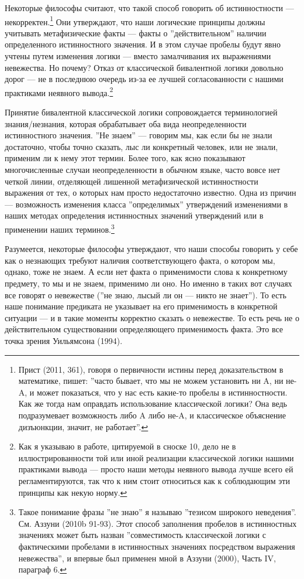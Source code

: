 \documentclass[11pt]{book}
\begin{document}
Некоторые философы считают, что такой способ говорить об истинностности --- некорректен.\footnote{Прист (2011, 361), говоря о первичности истины перед доказательством в математике, пишет: ''часто бывает, что мы не можем установить ни A, ни не-A, и может показаться, что у нас есть какие-то пробелы в истинностности. Как же тогда нам оправдать использование классической логики? Она ведь подразумевает возможность либо A либо не-A, и классическое объяснение дизъюнкции, значит, не работает''.} Они утверждают, что наши логические принципы должны учитывать метафизические факты --- факты о ''действительном'' наличии определенного истинностного значения. И в этом случае пробелы будут явно учтены путем изменения логики --- вместо замалчивания их выражениями невежества. Но почему? Отказ от классической бивалентной логики довольно дорог --- не в последнюю очередь из-за ее лучшей согласованности с нашими практиками неявного вывода.\footnote{Как я указываю в работе, цитируемой в сноске 10, дело не в иллюстрированности той или иной реализации классической логики нашими практиками вывода --- просто наши методы неявного вывода лучше всего ей регламентируются, так что к ним стоит относиться как к соблюдающим эти принципы как некую норму.}

Принятие бивалентной классической логики сопровождается терминологией знания/незнания, которая обрабатывает оба вида неопределенности истинностного значения. ''Не знаем'' --- говорим мы, как если бы не знали достаточно, чтобы точно сказать, лыс ли конкретный человек, или не знали, применим ли к нему этот термин. Более того, как ясно показывают многочисленные случаи неопределенности в обычном языке, часто вовсе нет четкой линии, отделяющей лишенной метафизической истинностности выражения от тех, о которых нам просто недостаточно известно. Одна из причин --- возможность изменения класса ''определимых'' утверждений изменениями в наших методах определения истинностных значений утверждений или в применении наших терминов.\footnote{Такое понимание фразы ''не знаю'' я называю ''тезисом широкого неведения''. См. Аззуни (2010b 91-93). Этот способ заполнения пробелов в истинностных значениях может быть назван ''совместимость классической логики с фактическими пробелами в истинностных значениях посредством выражения невежества'', и впервые был применен мной в Аззуни (2000), Часть IV, параграф 6.}

Разумеется, некоторые философы утверждают, что наши способы говорить у себе как о незнающих требуют наличия соответствующего факта, о котором мы, однако, тоже не знаем. А если нет факта о применимости слова к конкретному предмету, то мы и не знаем, применимо ли оно. Но именно в таких вот случаях все говорят о невежестве (''не знаю, лысый ли он --- никто не знает''). То есть наше понимание предиката не указывает на его применимость в конкретной ситуации --- и в такие моменты корректно сказать о невежестве. То есть речь не о действительном существовании определяющего применимость факта. Это все точка зрения Уильямсона (1994).
\end{document}
